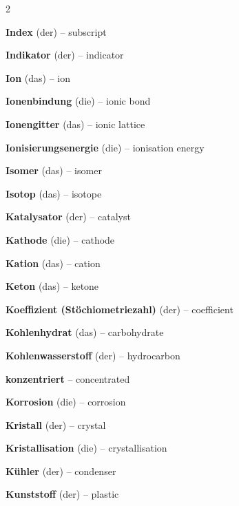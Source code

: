 \begin{multicols}{2}
\par\nopagebreak
\textbf{Index} (der) -- subscript\dotfill\hyperref[e:132]{\pageref*{e:132}}\par
\textbf{Indikator} (der) -- indicator\dotfill\hyperref[e:159]{\pageref*{e:159}}\par
\textbf{Ion} (das) -- ion\dotfill\hyperref[e:93]{\pageref*{e:93}}\par
\textbf{Ionenbindung} (die) -- ionic bond\dotfill\hyperref[e:106]{\pageref*{e:106}}\par
\textbf{Ionengitter} (das) -- ionic lattice\dotfill\hyperref[e:107]{\pageref*{e:107}}\par
\textbf{Ionisierungsenergie} (die) -- ionisation energy\dotfill\hyperref[e:99]{\pageref*{e:99}}\par
\textbf{Isomer} (das) -- isomer\dotfill\hyperref[e:216]{\pageref*{e:216}}\par
\textbf{Isotop} (das) -- isotope\dotfill\hyperref[e:83]{\pageref*{e:83}}\par

\par\nopagebreak
\textbf{Katalysator} (der) -- catalyst\dotfill\hyperref[e:142]{\pageref*{e:142}}\par
\textbf{Kathode} (die) -- cathode\dotfill\hyperref[e:199]{\pageref*{e:199}}\par
\textbf{Kation} (das) -- cation\dotfill\hyperref[e:94]{\pageref*{e:94}}\par
\textbf{Keton} (das) -- ketone\dotfill\hyperref[e:222]{\pageref*{e:222}}\par
\textbf{Koeffizient (Stöchiometriezahl)} (der) -- coefficient\dotfill\hyperref[e:131]{\pageref*{e:131}}\par
\textbf{Kohlenhydrat} (das) -- carbohydrate\dotfill\hyperref[e:241]{\pageref*{e:241}}\par
\textbf{Kohlenwasserstoff} (der) -- hydrocarbon\dotfill\hyperref[e:209]{\pageref*{e:209}}\par
\textbf{konzentriert} -- concentrated\dotfill\hyperref[e:170]{\pageref*{e:170}}\par
\textbf{Korrosion} (die) -- corrosion\dotfill\hyperref[e:190]{\pageref*{e:190}}\par
\textbf{Kristall} (der) -- crystal\dotfill\hyperref[e:108]{\pageref*{e:108}}\par
\textbf{Kristallisation} (die) -- crystallisation\dotfill\hyperref[e:37]{\pageref*{e:37}}\par
\textbf{Kühler} (der) -- condenser\dotfill\hyperref[e:58]{\pageref*{e:58}}\par
\textbf{Kunststoff} (der) -- plastic\dotfill\hyperref[e:239]{\pageref*{e:239}}\par


\end{multicols}
